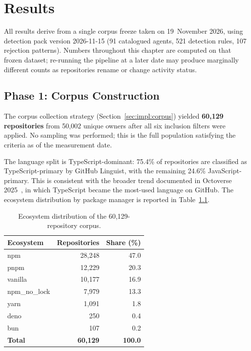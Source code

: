 
\chapter{Results}
\label{chap:results}

All results derive from a single corpus freeze taken on 19~November 2026, using detection pack version 2026-11-15 (91 catalogued agents, 521 detection rules, 107 rejection patterns). Numbers throughout this chapter are computed on that frozen dataset; re-running the pipeline at a later date may produce marginally different counts as repositories rename or change activity status.

\section{Phase 1: Corpus Construction}
\label{sec:res:corpus}

The corpus collection strategy (Section~\ref{sec:impl:corpus}) yielded \textbf{60,129 repositories} from 50,002 unique owners after all six inclusion filters were applied. No sampling was performed; this is the full population satisfying the criteria as of the measurement date.

The language split is TypeScript-dominant: 75.4\% of repositories are classified as TypeScript-primary by GitHub Linguist, with the remaining 24.6\% JavaScript-primary. This is consistent with the broader trend documented in Octoverse 2025~\cite{octoverse2025}, in which TypeScript became the most-used language on GitHub. The ecosystem distribution by package manager is reported in Table~\ref{tab:ecosystem}.

\begin{table}[h]
\centering
\caption{Ecosystem distribution of the 60,129-repository corpus.}
\label{tab:ecosystem}
\begin{tabular}{@{}lrr@{}}
\toprule
Ecosystem & Repositories & Share (\%) \\
\midrule
npm           & 28,248 & 47.0 \\
pnpm          & 12,229 & 20.3 \\
vanilla       & 10,177 & 16.9 \\
npm\_no\_lock &  7,979 & 13.3 \\
yarn          &  1,091 &  1.8 \\
deno          &    250 &  0.4 \\
bun           &    107 &  0.2 \\
\midrule
\textbf{Total} & \textbf{60,129} & \textbf{100.0} \\
\bottomrule
\end{tabular}
\end{table}

